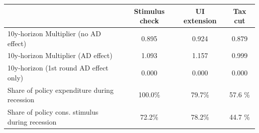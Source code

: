 \begin{tabular}{@{}lccc@{}} 
\toprule 
& Stimulus check    & UI extension    & Tax cut     \\  \midrule 
10y-horizon Multiplier (no AD effect) &0.895  & 0.924  & 0.879     \\ 
10y-horizon Multiplier (AD effect) &1.093  & 1.157  & 0.999     \\ 
10y-horizon (1st round AD effect only) &0.000  & 0.000  & 0.000     \\ 
Share of policy expenditure during recession &100.0\%  & 79.7\%  & 57.6 \%    \\ 
Share of policy cons. stimulus during recession &72.2\%  & 78.2\%  & 44.7 \%    \\ \bottomrule 
\end{tabular}  
